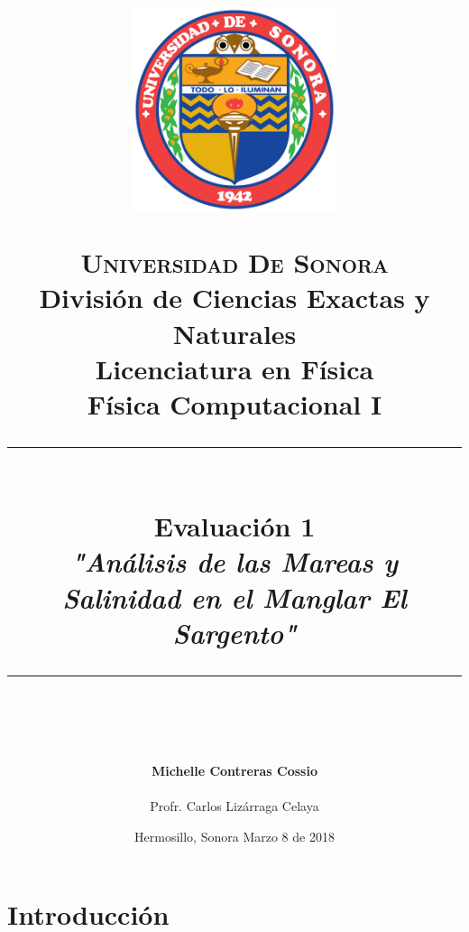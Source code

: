 \documentclass[12pt]{article}
\newcommand{\HRule}[1]{\rule{\linewidth}{#1}}
\begin{document}
\begin{titlepage}

\title{ \normalsize 
        \begin{center}
        \includegraphics[height=6cm]{logo.png}
        \end{center}
        \LARGE \textsc{\textbf{Universidad De Sonora}} \\ \bigskip
		\Large División de Ciencias Exactas y Naturales \\
        Licenciatura en Física \\ \bigskip
        \bigskip
        Física Computacional I
		\\ [0.1cm]  
		\HRule{2pt} \\
		\Large \textbf{{Evaluación 1}} \\
        \textit{\textbf{"Análisis de las Mareas y Salinidad en el Manglar El Sargento"}}
		\HRule{2pt} \\
		\normalsize \vspace*{0.001\baselineskip}}
        
\date{\bigskip \Large Hermosillo, Sonora  \hspace*{\fill}  Marzo 8 de 2018}

        
\author{
		\Large\textbf{ Michelle Contreras Cossio} \\ \bigskip
        \\ \bigskip
       \Large Profr. Carlos Lizárraga Celaya}
       \end{titlepage}
       \maketitle
       

\newpage
\pagestyle{plain}

\section{Introducción}
\end{document}
